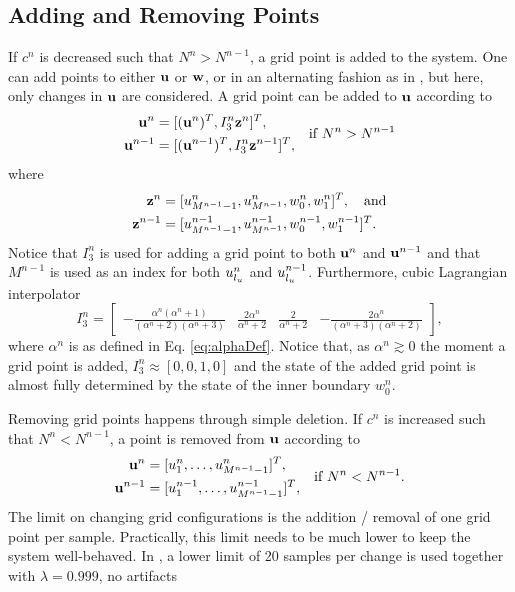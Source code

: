 \documentclass[fleqn]{jaes}
\begin{document}
\subsection{Adding and Removing Points}\label{sec:addRemove}
If $c^n$ is decreased such that $N^n > N^{n-1}$, a grid point is added to the system. One can add points to either $\mathbf{u}$ or $\mathbf{w}$, or in an alternating fashion as in \cite{Willemsen2021a}, but here, only changes in $\mathbf{u}$ are considered. A grid point can be added to $\mathbf{u}$ according to
\begin{equation}
\begin{aligned}
    \u^n &= [(\u^n)^T, I_3^n\z^n]^T,\\
    \u^{n-1} &= [(\u^{n-1})^T, I_3^n\z^{n-1}]^T,\\
\end{aligned} \quad \text{if } N^n > N^{n-1}
\end{equation}
where
\begin{equation*}
    \begin{aligned}
        \z^n &= [u_{M^{n-1}-1}^n, u_{M^{n-1}}^n, w_0^n, w_1^n]^T, \quad \text{and}\\
        \z^{n-1} &= [u_{M^{n-1}-1}^{n-1}, u_{M^{n-1}}^{n-1}, w_0^{n-1}, w_1^{n-1}]^T.
    \end{aligned}
\end{equation*}
Notice that $I_3^n$ is used for adding a grid point to both $\mathbf{u}^n$ and $\mathbf{u}^{n-1}$ and that $M^{n-1}$ is used as an index for both $u^n_{l_u}$ and $u^{n-1}_{l_u}$.
Furthermore, cubic Lagrangian interpolator
\begin{equation}\label{eq:customIp}
    I_3^n = \begin{bmatrix} -\frac{\alpha^n(\alpha^n+1)}{(\alpha^n+2)(\alpha^n+3)} &\frac{2\alpha^n}{\alpha^n+2} &\frac{2}{\alpha^n+2} 
    &-\frac{2\alpha^n}{(\alpha^n+3)(\alpha^n+2)}
    \end{bmatrix},
\end{equation}
where $\alpha^n$ is as defined in Eq. \eqref{eq:alphaDef}. Notice that, as $\alpha^n \gtrsim 0$ the moment a grid point is added, $I_3^n\approx [0, 0, 1, 0]$ and the state of the added grid point is almost fully determined by the state of the inner boundary $w_0^n$. 

Removing grid points happens through simple deletion. If $c^n$ is increased such that $N^n < N^{n-1}$, a point is removed from $\mathbf{u}$ according to
\begin{equation}
\begin{aligned}
    \u^n &= [u_1^n, \hdots, u_{M^{n-1}-1}^n]^T,\\
    \u^{n-1} &= [u_1^{n-1}, \hdots, u_{M^{n-1}-1}^{n-1}]^T,
    \end{aligned} \quad \text{if } N^n < N^{n-1}.
\end{equation}
The limit on changing grid configurations is the addition / removal of one grid point per sample. Practically, this limit needs to be much lower to keep the system well-behaved. In \cite{Willemsen2021b}, a lower limit of 20 samples per change is used together with $\lambda = 0.999$, no artifacts 
\end{document}
